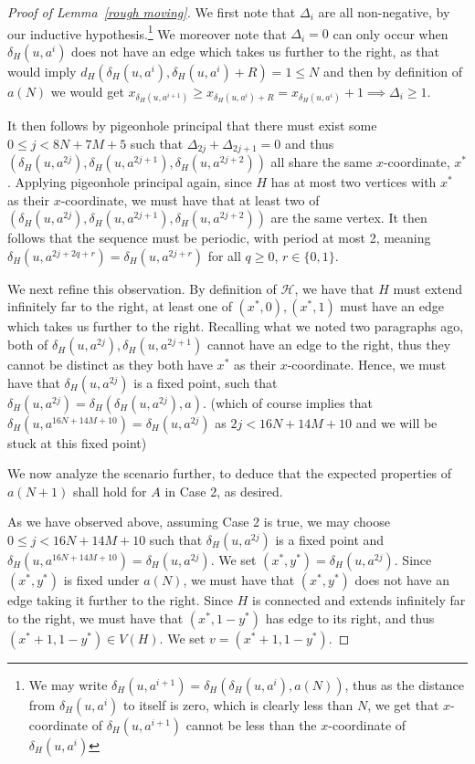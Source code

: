 \documentclass[a4paper]{article}
\theoremstyle{definition}
\begin{document}
\begin{proof}[Proof of Lemma~\ref*{rough moving}]
    We first note that $\Delta_i$ are all non-negative, by our inductive hypothesis.\footnote{We may write $\delta_H(u,a^{i+1}) = \delta_H(\delta_H(u,a^i),a(N))$, thus as the distance from $\delta_H(u,a^i)$ to itself is zero, which is clearly less than $N$, we get that $x$-coordinate of $\delta_H(u,a^{i+1})$ cannot be less than the $x$-coordinate of $\delta_H(u,a^i)$} We moreover note that $\Delta_i=0$ can only occur when $\delta_H(u,a^i)$ does not have an edge which takes us further to the right, as that would imply $d_H(\delta_H(u,a^i), \delta_H(u,a^i)+R) = 1\le N$ and then by definition of $a(N)$ we would get $x_{\delta_H(u,a^{i+1})} \ge x_{\delta_H(u,a^i)+R} = x_{\delta_H(u,a^i)}+1\implies \Delta_i \ge 1$.
    
    It then follows by pigeonhole principal that there must exist some $0\le j<8N+7M+5$ such that $\Delta_{2j}+\Delta_{2j+1} =0$ and thus $(\delta_H(u,a^{2j}),\delta_H(u,a^{2j+1}),\delta_H(u,a^{2j+2}))$ all share the same $x$-coordinate, $x^*$. Applying pigeonhole principal again, since $H$ has at most two vertices with $x^*$ as their $x$-coordinate, we must have that at least two of $(\delta_H(u,a^{2j}),\delta_H(u,a^{2j+1}),\delta_H(u,a^{2j+2}))$ are the same vertex. It then follows that the sequence must be periodic, with period at most 2, meaning $\delta_H(u,a^{2j+2q+r}) = \delta_H(u,a^{2j+r})$ for all $q \ge 0$, $r\in \{0,1\}$.
    
    We next refine this observation. By definition of $\mathcal{H}$, we have that $H$ must extend infinitely far to the right, at least one of $(x^*,0),(x^*,1)$ must have an edge which takes us further to the right. Recalling what we noted two paragraphs ago, both of $\delta_H(u,a^{2j}),\delta_H(u,a^{2j+1})$ cannot have an edge to the right, thus they cannot be distinct as they both have $x^*$ as their $x$-coordinate. Hence, we must have that $\delta_H(u,a^{2j})$ is a fixed point, such that $\delta_H(u,a^{2j}) = \delta_H(\delta_H(u,a^{2j}),a)$. (which of course implies that $\delta_H(u,a^{16N+14M+10}) = \delta_H(u,a^{2j})$ as $2j<16N+14M+10$ and we will be stuck at this fixed point)
    
    We now analyze the scenario further, to deduce that the expected properties of $a(N+1)$ shall hold for $A$ in Case 2, as desired. 
    
    As we have observed above, assuming Case 2 is true, we may choose $0\le j < 16N+14M+10$ such that $\delta_H(u,a^{2j})$ is a fixed point and $\delta_H(u,a^{16N+14M+10}) = \delta_H(u,a^{2j})$. We set $(x^*,y^*) = \delta_H(u,a^{2j})$. Since $(x^*,y^*)$ is fixed under $a(N)$, we must have that $(x^*,y^*)$ does not have an edge taking it further to the right. Since $H$ is connected and extends infinitely far to the right, we must have that $(x^*,1-y^*)$ has edge to its right, and thus $(x^*+1,1-y^*) \in V(H) $. We set $v = (x^*+1,1-y^*)$.
    

\end{proof}
\end{document}
